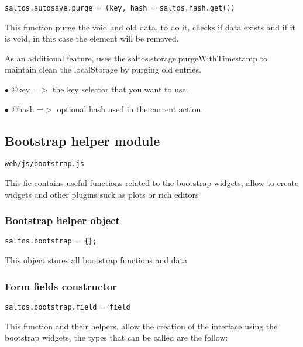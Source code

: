 \documentclass[a4paper]{article}
\begin{document}
\begin{lstlisting}
saltos.autosave.purge = (key, hash = saltos.hash.get())
\end{lstlisting}

This function purge the void and old data, to do it, checks if data exists
and if it is void, in this case the element will be removed.

As an additional feature, uses the saltos.storage.purgeWithTimestamp to maintain
clean the localStorage by purging old entries.

\begin{compactitem}
\item[\color{myblue}$\bullet$] @key  =$>$ the key selector that you want to use.
\item[\color{myblue}$\bullet$] @hash =$>$ optional hash used in the current action.
\end{compactitem}

\hypertarget{toc599}{}
\subsection{Bootstrap helper module}

\begin{lstlisting}
web/js/bootstrap.js
\end{lstlisting}

This fie contains useful functions related to the bootstrap widgets, allow to create widgets and
other plugins suck as plots or rich editors

\hypertarget{toc600}{}
\subsubsection{Bootstrap helper object}

\begin{lstlisting}
saltos.bootstrap = {};
\end{lstlisting}

This object stores all bootstrap functions and data

\hypertarget{toc601}{}
\subsubsection{Form fields constructor}

\begin{lstlisting}
saltos.bootstrap.field = field
\end{lstlisting}

This function and their helpers, allow the creation of the interface using the bootstrap
widgets, the types that can be called are the follow:
\end{document}
